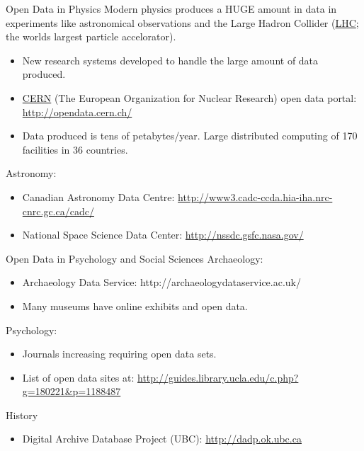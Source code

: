 \documentclass[xcolor=svgnames]{beamer}
\newcommand{\nl}{\\[1em]}
\begin{document}
\begin{frame}{Open Data in Physics}
Modern physics produces a HUGE amount in data in experiments like astronomical observations and the Large Hadron Collider (\href{https://home.cern/science/accelerators/large-hadron-collider}{LHC}; the worlds largest particle accelorator).
\begin{itemize}
\item New research systems developed to handle the large amount of data produced.
\item \href{https://home.cern/}{CERN} (The European Organization for Nuclear Research) open data portal: \url{http://opendata.cern.ch/}
\item Data produced is tens of petabytes/year. Large distributed computing of 170 facilities in 36 countries.\nl
\end{itemize}

Astronomy:
\begin{itemize}
\item Canadian Astronomy Data Centre: \url{http://www3.cadc-ccda.hia-iha.nrc-cnrc.gc.ca/cadc/}
\item National Space Science Data Center: \url{http://nssdc.gsfc.nasa.gov/}
\end{itemize}
\end{frame}



\begin{frame}{Open Data in Psychology and Social Sciences}
Archaeology: 
\begin{itemize}
\item Archaeology Data Service: http://archaeologydataservice.ac.uk/
\item Many museums have online exhibits and open data.\nl
\end{itemize}

Psychology:
\begin{itemize}
\item Journals increasing requiring open data sets.
\item List of open data sites at: \url{http://guides.library.ucla.edu/c.php?g=180221\&p=1188487}
\end{itemize}


History	
\begin{itemize}
\item Digital Archive Database Project (UBC): \url{http://dadp.ok.ubc.ca}
\end{itemize}
\end{frame}
\end{document}
